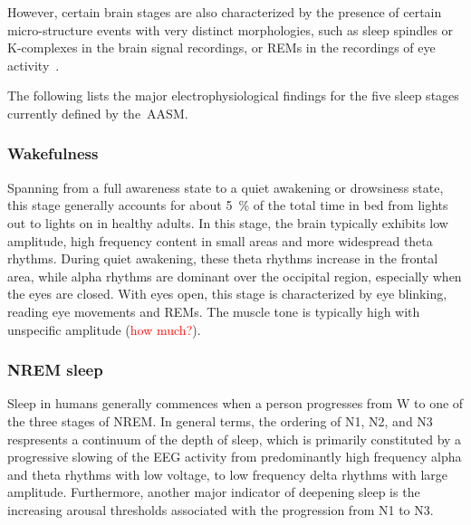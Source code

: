             However, certain brain stages are also characterized by the presence of certain micro-structure events with very distinct morphologies, such as sleep spindles or K-complexes in the brain signal recordings, or \acp{REM} in the recordings of eye activity~\citep{Brown2012, Saper2010, Carskadon2011a, Peyron1998}.
            
            The following lists the major electrophysiological findings for the five sleep stages currently defined by the~\ac{AASM}.
            
            
            \subsubsection{Wakefulness}\label{sec:wakefulness}
            Spanning from a full awareness state to a quiet awakening or drowsiness state, this stage generally accounts for about \SI{5}{\percent} of the total time in bed from lights out to lights on in healthy adults.
            In this stage, the brain typically exhibits low amplitude, high frequency content in small areas and more widespread theta rhythms.
            During quiet awakening, these theta rhythms increase in the frontal area, while alpha rhythms are dominant over the occipital region, especially when the eyes are closed.
            With eyes open, this stage is characterized by eye blinking, reading eye movements and \acp{REM}.
            The muscle tone is typically high with unspecific amplitude (\textcolor{red}{how much?}).
            
            \subsubsection{NREM sleep}
            Sleep in humans generally commences when a person progresses from \ac{W} to one of the three stages of \ac{NREM}.
            In general terms, the ordering of \ac{N1}, \ac{N2}, and \ac{N3} respresents a continuum of the depth of sleep, which is primarily constituted by a progressive slowing of the \ac{EEG} activity from predominantly high frequency alpha and theta rhythms with low voltage, to low frequency delta rhythms with large amplitude.
            Furthermore, another major indicator of deepening sleep is the increasing arousal thresholds associated with the progression from \ac{N1} to \ac{N3}.
            
